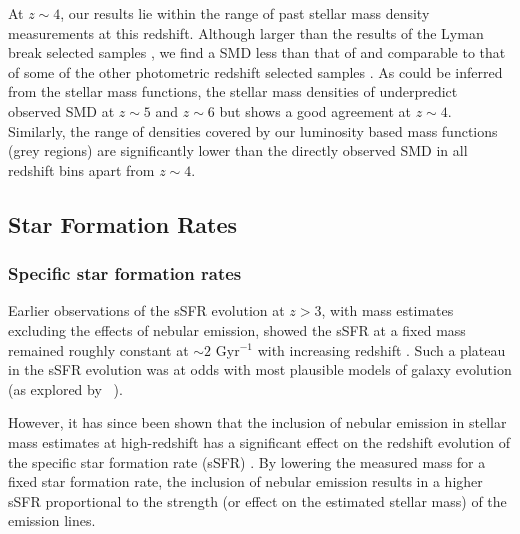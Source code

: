 At $z \sim 4$, our results lie within the range of past stellar mass density measurements at this redshift. Although larger than the results of the Lyman break selected samples \citep{Gonzalez:2011dn,2012ApJ...752...66L,Stark:2013ix}, we find a SMD less than that of \citet{Santini:2012jq} and comparable to that of some of the other photometric redshift selected samples \citep{PerezGonzalez:2008cq,Marchesini:2009ef}. As could be inferred from the stellar mass functions, the stellar mass densities of \citet{Dave:2013bf} underpredict observed SMD at $z \sim 5$ and $z \sim 6$ but shows a good agreement at $z \sim 4$. Similarly, the range of densities covered by our luminosity based mass functions (grey regions) are significantly lower than the directly observed SMD in all redshift bins apart from $z\sim4$. 

\subsection{Star Formation Rates}
\subsubsection{Specific star formation rates}
Earlier observations of the sSFR evolution at $z > 3$, with mass estimates excluding the effects of nebular emission, showed the sSFR at a fixed mass remained roughly constant at $\sim 2$ Gyr$^{-1}$ with increasing redshift \citep{2009ApJ...697.1493S,Gonzalez:2010hm,2012ApJ...754...83B}. Such a plateau in the sSFR evolution was at odds with most plausible models of galaxy evolution (as explored by \citeauthor{Weinmann:2011hh}~\citeyear{Weinmann:2011hh}).

However, it has since been shown that the inclusion of nebular emission in stellar mass estimates at high-redshift has a significant effect on the redshift evolution of the specific star formation rate (sSFR) \citep{2009A&A...502..423S,2010A&A...515A..73S,Stark:2013ix,Gonzalez:2014do}. By lowering the measured mass for a fixed star formation rate, the inclusion of nebular emission results in a higher sSFR proportional to the strength (or effect on the estimated stellar mass) of the emission lines.

